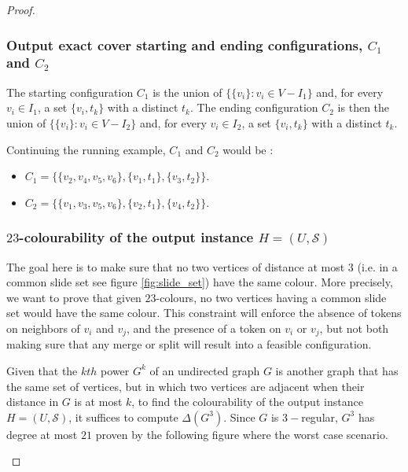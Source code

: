 \begin{proof}
\subsubsection{Output exact cover starting and ending configurations, $C_1$ and $C_2$}
The starting configuration $C_1$ is the union of $\{\{ v_i \} : v_i \in V - I_1\}$ and, for every $v_i \in I_1$, a set $\{v_i, t_k\}$ with a
distinct $t_k$.
The ending configuration $C_2$ is then the union of $\{\{ v_i \} : v_i \in V - I_2\}$ and, for every $v_i \in I_2$, a set $\{v_i, t_k\}$ with a
distinct $t_k$.

\begin{example}Continuing the running example, $C_1$ and $C_2$ would be :
\begin{itemize}
  \item $C_1 = \{ \{v_2, v_4, v_5, v_6\}, \{v_1, t_1\}, \{v_3, t_2\}\}$.
  \item $C_2 = \{ \{v_1, v_3, v_5, v_6\}, \{v_2, t_1\}, \{v_4, t_2\}\}$.
\end{itemize}
\end{example}

\subsubsection{$23$-colourability of the output instance $H = (U, \mathcal{S})$}\label{subsubsection:23_colorability}
The goal here is to make sure that no two vertices of distance at most $3$ (i.e. in a common slide set see figure \ref{fig:slide_set}) have the same
colour. More precisely, we want to prove that given $23$-colours, no two vertices having a common slide set would have the same colour.
This constraint will enforce the absence of tokens on neighbors of $v_i$ and $v_j$, and the presence of a token on $v_i$ or $v_j$, but not both
making sure that any merge or split will result into a feasible configuration.

Given that the $kth$ power $G^{k}$ of an undirected graph $G$ is another graph that has the same set of vertices, but in which two vertices are
adjacent when their distance in $G$ is at most $k$, to find the colourability of the output instance $H = (U, \mathcal{S})$, it suffices to
compute $\Delta(G^{3})$. Since $G$ is $3-$regular, $G^3$ has degree at most $21$ proven by the following figure where the worst case
scenario.

\begin{figure} [H]
  \centering
\end{figure}
\end{proof}
